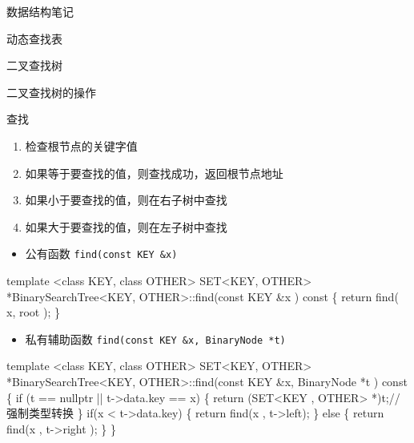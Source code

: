 \documentclass[
  ignorenonframetext,
]{beamer}
\newenvironment{Shaded}{}{}
\newcommand{\NormalTok}[1]{#1}
\providecommand{\tightlist}{%
  \setlength{\itemsep}{0pt}\setlength{\parskip}{0pt}}
\begin{document}
\begin{frame}[fragile]{数据结构笔记}
\begin{block}{动态查找表}
\begin{block}{二叉查找树}
\begin{block}{二叉查找树的操作}
\protect{}\label{ux4e8cux53c9ux67e5ux627eux6811ux7684ux64cdux4f5c}
\begin{block}{查找}
\protect{}\label{ux67e5ux627e-1}
\begin{enumerate}
\tightlist
\item
  检查根节点的关键字值
\item
  如果等于要查找的值，则查找成功，返回根节点地址
\item
  如果小于要查找的值，则在右子树中查找
\item
  如果大于要查找的值，则在左子树中查找
\end{enumerate}

\begin{itemize}
\tightlist
\item
  公有函数 \texttt{find(const\ KEY\ \&x)}
\end{itemize}

\begin{Shaded}
\begin{Highlighting}[]
\NormalTok{template \textless{}class KEY, class OTHER\textgreater{}}
\NormalTok{SET\textless{}KEY, OTHER\textgreater{} *BinarySearchTree\textless{}KEY, OTHER\textgreater{}::find(const KEY \&x ) const}
\NormalTok{\{}
\NormalTok{  return find( x, root );}
\NormalTok{\}}
\end{Highlighting}
\end{Shaded}

\begin{itemize}
\tightlist
\item
  私有辅助函数 \texttt{find(const\ KEY\ \&x,\ BinaryNode\ *t)}
\end{itemize}

\begin{Shaded}
\begin{Highlighting}[]
\NormalTok{template \textless{}class KEY, class OTHER\textgreater{}}
\NormalTok{SET\textless{}KEY, OTHER\textgreater{} *BinarySearchTree\textless{}KEY, OTHER\textgreater{}::find(const KEY \&x, BinaryNode *t ) const}
\NormalTok{\{}
\NormalTok{  if (t == nullptr || t{-}\textgreater{}data.key == x)}
\NormalTok{  \{}
\NormalTok{    return (SET\textless{}KEY , OTHER\textgreater{} *)t;//强制类型转换}
\NormalTok{  \}}
\NormalTok{  if(x \textless{} t{-}\textgreater{}data.key)}
\NormalTok{  \{}
\NormalTok{    return find(x , t{-}\textgreater{}left);}
\NormalTok{  \}}
\NormalTok{  else}
\NormalTok{  \{}
\NormalTok{    return find(x , t{-}\textgreater{}right );}
\NormalTok{  \}}
\NormalTok{\}}
\end{Highlighting}
\end{Shaded}
\end{block}


\end{block}
\end{block}
\end{block}
\end{frame}
\end{document}
